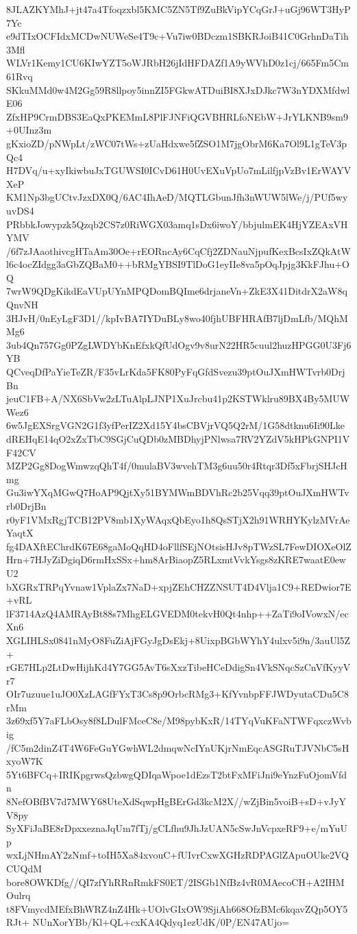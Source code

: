 8JLAZKYMhJ+jt47a4Tfoqzxbl5KMC5ZN5Tf9ZuBkVipYCqGrJ+uGj96WT3HyP7Yc
e9dTIxOCFIdxMCDwNUWeSe4T9c+Vu7iw0BDczm1SBKRJoiB41C0GrhnDaTih3Mfl
WLVr1Kemy1CU6KIwYZT5oWJRbH26jIdHFDAZf1A9yWVhD0z1cj/665Fm5Cm61Rvq
SKkuMMd0w4M2Gg59R8llpoy5innZI5FGkwATDuiBI8XJxDJkc7W3nYDXMfdwlE06
ZfxHP9CrmDBS3EaQxPKEMmL8PlFJNFiQGVBHRLfoNEbW+JrYLKNB9sm9+0UInz3m
gKxioZD/pNWpLt/zWC07tWs+zUaHdxwe5fZSO1M7jgObrM6Ka7Ol9L1gTeV3pQc4
H7DVq/u+xyIkiwbuJxTGUWSI0ICvD61H0UvEXuVpUo7mLilfjpVzBv1ErWAYVXeP
KM1Np3bgUCtvJzxDX0Q/6AC4IhAeD/MQTLGbunJfh3nWUW5lWe/j/PUf5wyuvDS4
PRbbkJowypzk5Qzqb2CS7z0RiWGX03amq1sDx6iwoY/bbjulmEK4HjYZEAxVHYMV
/6f7zJAaothivcgHTaAm30Oe+rEORncAy6CqCfj2ZDNauNjpufKexBcsIxZQkAtW
l6c4ocZIdgg3aGbZQBaM0++bRMgYBSI9TlDoG1eyIIe8va5pOqJpjg3KkFJhu+OQ
7wrW9QDgKikdEaVUpUYnMPQDomBQIme6drjaneVn+ZkE3X41DitdrX2aW8qQnvNH
3HJvH/0nEyLgF3D1//kpIvBA7IYDuBLy8wo40fjhUBFHRAfB7ljDmLfb/MQhMMg6
3ub4Qn757Gg0PZgLWDYbKnEfxkQfUdOgv9v8urN22HR5cuul2huzHPGG0U3Fj6YB
QCveqDfPaYieTeZR/F35vLrKda5FK80PyFqGfdSvezu39ptOuJXmHWTvrb0DrjBn
jeuC1FB+A/NX6SbVw2zLTuAlpLJNP1XuJrcbu41p2KSTWklru89BX4By5MUWWez6
6w5JgEXSrgVGN2G1f3yfPerIZ2Xd15Y4bsCBVjrVQ5Q2rM/1G58dtknu6Ii90Lke
dREHqE14qO2xZxTbC9SGjCuQDb0zMBDhyjPNlwsa7RV2YZdV5kHPkGNPI1VF42CV
MZP2Gg8DogWmwzqQhT4f/0mulaBV3wvehTM3g6uu50r4Rtqr3Df5xFbrjSHJcHmg
Gu3iwYXqMGwQ7HoAP9QjtXy51BYMWmBDVhRc2b25Vqq39ptOuJXmHWTvrb0DrjBn
r0yF1VMxRgjTCB12PV8mb1XyWAqxQbEyo1h8QsSTjX2h91WRHYKylzMVrAeYaqtX
fg4DAXftEChrdK67E68gaMoQqHD4oFllfSEjNOtsisHJv8pTWzSL7FewDIOXeOlZ
Hrn+7HJyZiDgiqD6rmHxSSx+hm8ArBiaopZ5RLxmtVvkYsgs8zKRE7waatE0ewU2
bXGRxTRPqYvnaw1VplaZx7NaD+xpjZEhCHZZNSUT4D4Vlja1C9+REDwior7E+vRL
lF3714AzQ4AMRAyBt88s7MhgELGVEDM0tekvH0Qt4nhp++ZaTi9oIVowxN/ecXn6
XGLIHLSx0841nMyO8FuZiAjFGyJgDsEkj+8UixpBGbWYhY4ulxv5i9n/3auUl5Z+
rGE7HLp2LtDwHijhKd4Y7GG5AvT6sXxzTibeHCeDdigSn4VkSNqcSzCnVfKyyVr7
OIr7uzuue1uJO0XzLAGfFYxT3Cs8p9OrbcRMg3+KfYvnbpFFJWDyutaCDu5C8rMm
3z69xf5Y7aFLbOsy8f8LDulFMceC8e/M98pybKxR/14TYqVuKFaNTWFqxczWvbig
/fC5m2dinZ4T4W6FeGuYGwhWL2dmqwNcIYnUKjrNmEqcASGRuTJVNbC5sHxyoW7K
5Yt6BFCq+IRIKpgrwsQzbwgQDIqaWpoe1dEzsT2btFxMFiJni9eYnzFuOjomVfdn
8NefOBfBV7d7MWY68UteXdSqwpHgBErGd3kcM2X//wZjBin5voiB+sD+vJyYV8py
SyXFiJaBE8rDpxxeznaJqUm7fTj/gCLfhu9JhJzUAN5cSwJnVcpxeRF9+e/mYuUp
wxLjNHmAY2zNmf+toIH5Xa84xvouC+fUIvrCxwXGHzRDPAGlZApuOUke2VQCUQdM
bore8OWKDfg//QI7zfYhRRnRmkFS0ET/2ISGb1NfBz4vR0MAecoCH+A2IHMOulrq
t8FVmycdMEfxBhWRZ4nZ4Hk+UOlvGIxOW9SjiAh668OfzBMc6kqavZQp5OY5RJt+
NUnXorYBb/Kl+QL+cxKA4Qdyq1ezUdK/0P/EN47AUjo=
